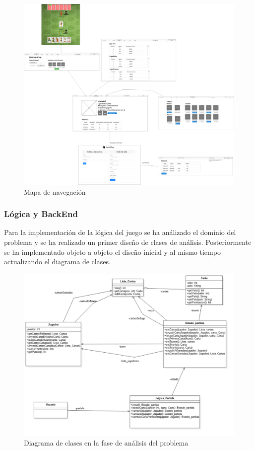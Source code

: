 \begin{figure}
  \includegraphics[width=\linewidth]{figuras/mapaNavegacion.png}
  \caption{Mapa de navegación}
  \label{fig:mapaDeNavegacion}
\end{figure}

\subsubsection{Lógica y BackEnd}

Para la implementación de la lógica del juego se ha análizado el dominio del problema y se ha realizado un primer diseño de clases de análisis. Posteriormente se ha implementado objeto a objeto el diseño inicial y al mismo tiempo actualizando el diagrama de clases.

\begin{figure}[H]
\centering
\includegraphics[scale = 0.5]{figuras/logica_juego/diagramaClasesDisenyo.png}
\caption{Diagrama de clases en la fase de análisis del problema}
\label{fig:diagramaClasesLogicaJuegoInicial}
\end{figure}

